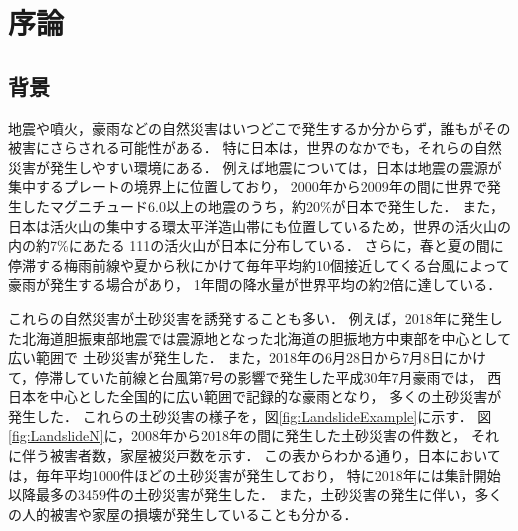 \chapter{序論}
\thispagestyle{empty}
\label{ch:Introduction}
\minitoc


\newpage


\section{背景}\label{sec:Background}

地震や噴火，豪雨などの自然災害はいつどこで発生するか分からず，誰もがその被害にさらされる可能性がある．
特に日本は，世界のなかでも，それらの自然災害が発生しやすい環境にある．
例えば地震については，日本は地震の震源が集中するプレートの境界上に位置しており，
2000年から2009年の間に世界で発生したマグニチュード6.0以上の地震のうち，約20\%が日本で発生した\cite{内閣府2010}．
また，日本は活火山の集中する環太平洋造山帯にも位置しているため，世界の活火山の内の約7\%にあたる
111の活火山が日本に分布している\cite{気象庁2019a}\cite{内閣府2010}．
さらに，春と夏の間に停滞する梅雨前線や夏から秋にかけて毎年平均約10個接近してくる台風によって豪雨が発生する場合があり，
1年間の降水量が世界平均の約2倍に達している\cite{気象庁2019b}\cite{国交省2004}．

これらの自然災害が土砂災害を誘発することも多い\cite{国交省2007}．
例えば，2018年に発生した北海道胆振東部地震では震源地となった北海道の胆振地方中東部を中心として広い範囲で
土砂災害が発生した\cite{国交省2019}．
また，2018年の6月28日から7月8日にかけて，停滞していた前線と台風第7号の影響で発生した平成30年7月豪雨では，
西日本を中心とした全国的に広い範囲で記録的な豪雨となり，
多くの土砂災害が発生した\cite{気象庁2018}．
これらの土砂災害の様子を，図\ref{fig:LandslideExample}に示す．
図\ref{fig:LandslideN}に，2008年から2018年の間に発生した土砂災害の件数と，
それに伴う被害者数，家屋被災戸数を示す\cite{国交省2019}．
この表からわかる通り，日本においては，毎年平均1000件ほどの土砂災害が発生しており，
特に2018年には集計開始以降最多の3459件の土砂災害が発生した．
また，土砂災害の発生に伴い，多くの人的被害や家屋の損壊が発生していることも分かる．

